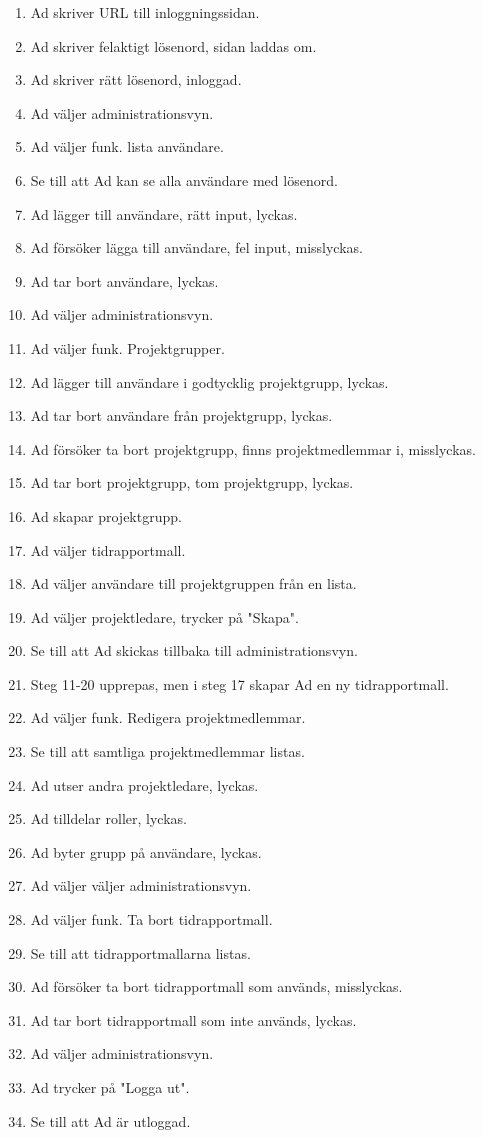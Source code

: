 \documentclass[a4paper]{article}
\begin{document}
\begin{ST}
\begin{enumerate}
\item Ad skriver URL till inloggningssidan.
\item Ad skriver felaktigt lösenord, sidan laddas om.
\item Ad skriver rätt lösenord, inloggad.
\item Ad väljer administrationsvyn.
\item Ad väljer funk. lista användare.
\item Se till att Ad kan se alla användare med lösenord.
\item Ad lägger till användare, rätt input, lyckas.
\item Ad försöker lägga till användare, fel input, misslyckas.
\item Ad tar bort användare, lyckas.
\item Ad väljer administrationsvyn.
\item Ad väljer funk. Projektgrupper.
\item Ad lägger till användare i godtycklig projektgrupp, lyckas.
\item Ad tar bort användare från projektgrupp, lyckas.
\item Ad försöker ta bort projektgrupp, finns projektmedlemmar i, misslyckas.
\item Ad tar bort projektgrupp, tom projektgrupp, lyckas.
\item Ad skapar projektgrupp.
\item Ad väljer tidrapportmall.
\item Ad väljer användare till projektgruppen från en lista.
\item Ad väljer projektledare, trycker på "Skapa".
\item Se till att Ad skickas tillbaka till administrationsvyn.
\item Steg 11-20 upprepas, men i steg 17 skapar Ad en ny tidrapportmall.
\item Ad väljer funk. Redigera projektmedlemmar.
\item Se till att samtliga projektmedlemmar listas.
\item Ad utser andra projektledare, lyckas.
\item Ad tilldelar roller, lyckas.
\item Ad byter grupp på användare, lyckas.
\item Ad väljer väljer administrationsvyn.
\item Ad väljer funk. Ta bort tidrapportmall.
\item Se till att tidrapportmallarna listas.
\item Ad försöker ta bort tidrapportmall som används, misslyckas.
\item Ad tar bort tidrapportmall som inte används, lyckas.
\item Ad väljer administrationsvyn.
\item Ad trycker på "Logga ut".
\item Se till att Ad är utloggad.
\end{enumerate}

\end{ST}
\end{document}
